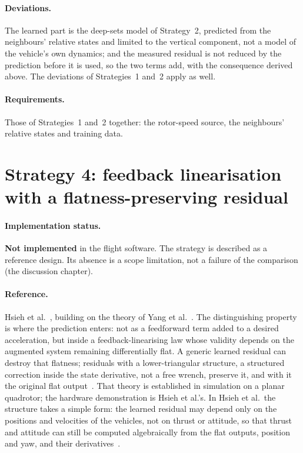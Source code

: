 \paragraph{Deviations.} The learned part is the deep-sets model of Strategy~2, predicted from the
neighbours' relative states and limited to the vertical component, not a model of the vehicle's own
dynamics; and the measured residual is not reduced by the prediction before it is used, so the two
terms add, with the consequence derived above. The deviations of Strategies~1 and~2 apply as well.

\paragraph{Requirements.} Those of Strategies~1 and~2 together: the rotor-speed source, the
neighbours' relative states and training data.

\section{Strategy 4: feedback linearisation with a flatness-preserving residual}
\label{sec:ctrl-s4}

\paragraph{Implementation status.} \textbf{Not implemented} in the flight software. The strategy is
described as a reference design. Its absence is a scope limitation, not a failure of the
comparison (the discussion chapter).

\paragraph{Reference.} Hsieh et al.~\cite{hsieh2026flatness}, building on the theory of Yang et
al.~\cite{yang2025flatnessresiduals}. The distinguishing property is where the prediction enters:
not as a feedforward term added to a desired acceleration, but inside a feedback-linearising law
whose validity depends on the augmented system remaining differentially flat. A generic learned
residual can destroy that flatness; residuals with a lower-triangular structure, a structured
correction inside the state derivative, not a free wrench, preserve it, and with it the original
flat output~\cite{yang2025flatnessresiduals}. That theory is established in simulation on a planar
quadrotor; the hardware demonstration is Hsieh et al.'s.
In Hsieh et al.\ the structure takes a simple form: the learned residual may depend only on the
positions and velocities of the vehicles, not on thrust or attitude, so that thrust and attitude
can still be computed algebraically from the flat outputs, position and yaw, and their
derivatives~\cite{hsieh2026flatness}.

